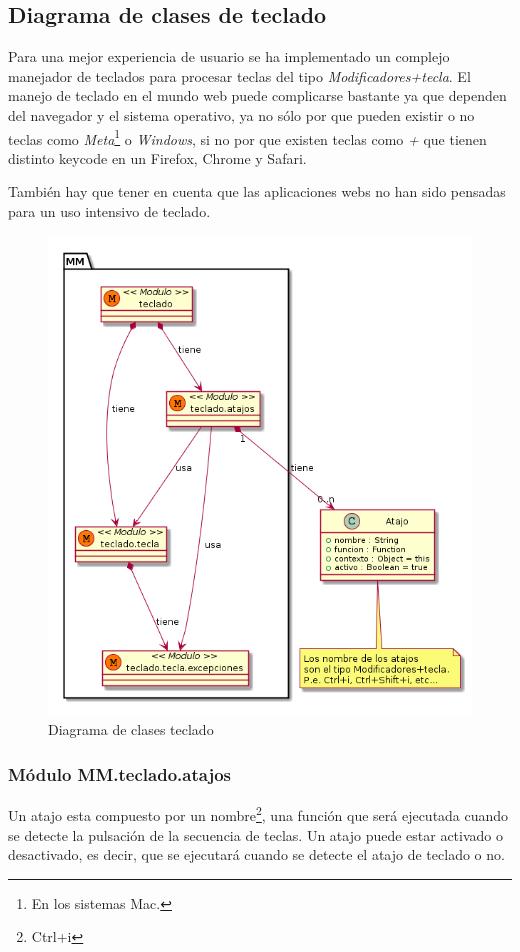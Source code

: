 \subsection{Diagrama de clases de teclado}
Para una mejor experiencia de usuario se ha implementado un complejo manejador de teclados para procesar teclas del tipo \textit{Modificadores+tecla}. El manejo de teclado en el mundo web puede complicarse bastante ya que dependen del navegador y el sistema operativo, ya no sólo por que pueden existir o no teclas como \textit{Meta}\footnote{En los sistemas Mac.} o \textit{Windows}, si no por que existen teclas como \textit{+} que tienen distinto keycode en un Firefox, Chrome y Safari.

También hay que tener en cuenta que las aplicaciones webs no han sido pensadas para un uso intensivo de teclado.   

\begin{figure}[tbph]
\centering
\includegraphics[width=0.8\linewidth]{imagenes/diagrama-clases-mm-teclado}
\caption{Diagrama de clases teclado}
\label{fig:diagrama-clases-mm-teclado}
\end{figure}


\subsubsection{Módulo MM.teclado.atajos}
Un atajo esta compuesto por un nombre\footnote{Ctrl+i}, una función que será ejecutada cuando se
detecte la pulsación de la secuencia de teclas. Un atajo puede estar activado o desactivado, es
decir, que se ejecutará cuando se detecte el atajo de teclado o no. 

